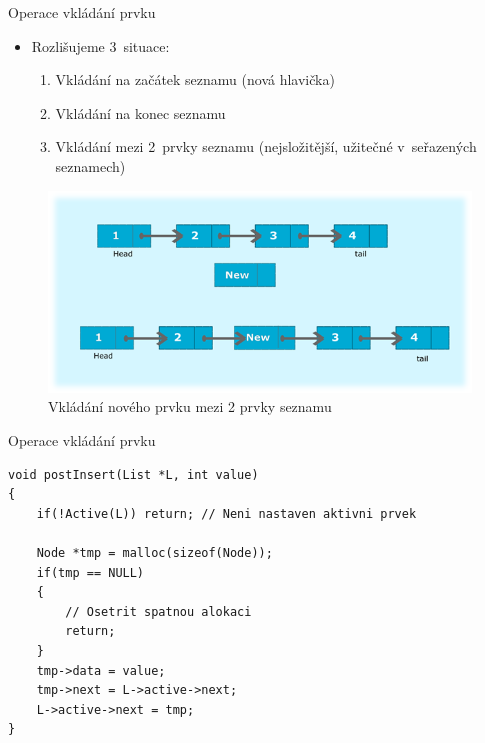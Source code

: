 \documentclass[10pt, hyperref={unicode}]{beamer}
\begin{document}
\begin{frame}{Operace vkládání prvku}
\begin{itemize}
    \item Rozlišujeme 3~situace:
    \begin{enumerate}
        \item Vkládání na začátek seznamu (nová hlavička)
        \item Vkládání na konec seznamu
        \item Vkládání mezi 2~prvky seznamu (nejsložitější, užitečné v~seřazených seznamech)
    \end{enumerate}
\end{itemize}
\begin{figure}[h]
    \centering
    \includegraphics[scale=0.52]{insert.png}
    \caption{Vkládání nového prvku mezi 2 prvky seznamu}
\end{figure}
\end{frame}


\begin{frame}[fragile]{Operace vkládání prvku}
\begin{lstlisting}[title=Vkládání nového prvku za aktivní prvek seznamu v~jazyce C:]
void postInsert(List *L, int value)
{
    if(!Active(L)) return; // Neni nastaven aktivni prvek
    
    Node *tmp = malloc(sizeof(Node));
    if(tmp == NULL)
    {
        // Osetrit spatnou alokaci
        return;
    }
	tmp->data = value;
	tmp->next = L->active->next;
	L->active->next = tmp;
}
\end{lstlisting}
\end{frame}
\end{document}
